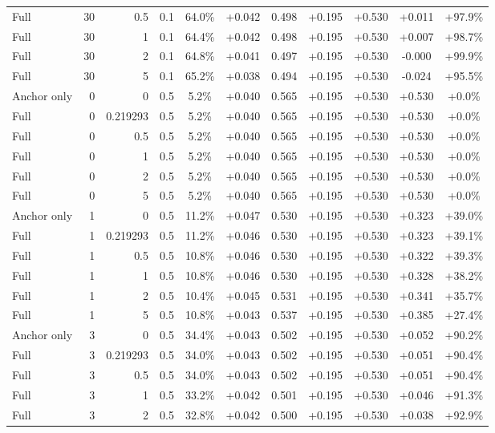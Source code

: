 \begin{table}[htbp]
\begin{tabular}{lrrrccccccc}
Full & 30 & 0.5 & 0.1 & 64.0\% & +0.042 & 0.498 & +0.195 & +0.530 & +0.011 & +97.9\% \\
Full & 30 & 1 & 0.1 & 64.4\% & +0.042 & 0.498 & +0.195 & +0.530 & +0.007 & +98.7\% \\
Full & 30 & 2 & 0.1 & 64.8\% & +0.041 & 0.497 & +0.195 & +0.530 & -0.000 & +99.9\% \\
Full & 30 & 5 & 0.1 & 65.2\% & +0.038 & 0.494 & +0.195 & +0.530 & -0.024 & +95.5\% \\
Anchor only & 0 & 0 & 0.5 & 5.2\% & +0.040 & 0.565 & +0.195 & +0.530 & +0.530 & +0.0\% \\
Full & 0 & 0.219293 & 0.5 & 5.2\% & +0.040 & 0.565 & +0.195 & +0.530 & +0.530 & +0.0\% \\
Full & 0 & 0.5 & 0.5 & 5.2\% & +0.040 & 0.565 & +0.195 & +0.530 & +0.530 & +0.0\% \\
Full & 0 & 1 & 0.5 & 5.2\% & +0.040 & 0.565 & +0.195 & +0.530 & +0.530 & +0.0\% \\
Full & 0 & 2 & 0.5 & 5.2\% & +0.040 & 0.565 & +0.195 & +0.530 & +0.530 & +0.0\% \\
Full & 0 & 5 & 0.5 & 5.2\% & +0.040 & 0.565 & +0.195 & +0.530 & +0.530 & +0.0\% \\
Anchor only & 1 & 0 & 0.5 & 11.2\% & +0.047 & 0.530 & +0.195 & +0.530 & +0.323 & +39.0\% \\
Full & 1 & 0.219293 & 0.5 & 11.2\% & +0.046 & 0.530 & +0.195 & +0.530 & +0.323 & +39.1\% \\
Full & 1 & 0.5 & 0.5 & 10.8\% & +0.046 & 0.530 & +0.195 & +0.530 & +0.322 & +39.3\% \\
Full & 1 & 1 & 0.5 & 10.8\% & +0.046 & 0.530 & +0.195 & +0.530 & +0.328 & +38.2\% \\
Full & 1 & 2 & 0.5 & 10.4\% & +0.045 & 0.531 & +0.195 & +0.530 & +0.341 & +35.7\% \\
Full & 1 & 5 & 0.5 & 10.8\% & +0.043 & 0.537 & +0.195 & +0.530 & +0.385 & +27.4\% \\
Anchor only & 3 & 0 & 0.5 & 34.4\% & +0.043 & 0.502 & +0.195 & +0.530 & +0.052 & +90.2\% \\
Full & 3 & 0.219293 & 0.5 & 34.0\% & +0.043 & 0.502 & +0.195 & +0.530 & +0.051 & +90.4\% \\
Full & 3 & 0.5 & 0.5 & 34.0\% & +0.043 & 0.502 & +0.195 & +0.530 & +0.051 & +90.4\% \\
Full & 3 & 1 & 0.5 & 33.2\% & +0.042 & 0.501 & +0.195 & +0.530 & +0.046 & +91.3\% \\
Full & 3 & 2 & 0.5 & 32.8\% & +0.042 & 0.500 & +0.195 & +0.530 & +0.038 & +92.9\% \\

\end{tabular}
\end{table}
